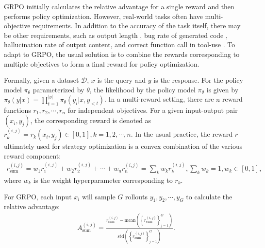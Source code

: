 \documentclass{llmxive}
\begin{document}
GRPO initially calculates the relative advantage for a single reward and then performs policy optimization. However, real-world tasks often have multi-objective requirements. In addition to the accuracy of the task itself, there may be other requirements, such as output length \citep{flashthink, liu2025learn, aggarwal2025l1}, bug rate of generated code \citep{DBLP:journals/ese/TambonDNKDA25, DBLP:conf/icsm/Gao25}, hallucination rate of output content, and correct function call in tool-use \citep{torl, logic_rl}. To adapt to GRPO, the usual solution is to combine the rewards corresponding to multiple objectives to form a final reward for policy optimization.

Formally, given a dataset $\mathcal{D}$, $x$ is the query and $y$ is the response. For the policy model $\pi_\theta$ parameterized by $\theta$, the likelihood by the policy model $\pi_\theta$ is given by $\pi_\theta(y|x) = \prod_{t=1}^{|y|}\pi_\theta(y_i | x, y_{<t})$. In a multi-reward setting, there are $n$ reward functions $r_1, r_2, \cdots, r_n$ for independent objectives. For a given input-output pair $(x_i, y_j)$, the corresponding reward is denoted as $r_k^{(i,j)} = r_k(x_i, y_j) \in [0,1], k=1,2,\cdots,n$. In the usual practice, the reward $r$ ultimately used for strategy optimization is a convex combination of the various reward component:
\begin{align}
    r_\text{sum}^{(i,j)} = w_1r_1^{(i,j)} + w_2r_2^{(i,j)} + \cdots + w_nr_n^{(i,j)} = \sum_{k} w_k r_k^{(i,j)}, \sum_k w_k = 1, w_k \in [0, 1],
\end{align}
where $w_k$ is the weight hyperparameter corresponding to $r_k$.

For GRPO, each input $x_i$ will sample $G$ rollouts $y_1, y_2, \cdots, y_G$ to calculate the relative advantage:
\begin{align}
    A_\text{sum}^{(i,j)} = \frac{r_\text{sum}^{(i,j)} - \text{mean} \left(\left\{ r_\text{sum}^{(i,j)} \right\}_{j=1}^G\right)}{\text{std} \left(\left\{ r_\text{sum}^{(i,j)} \right\}_{j=1}^G\right)}.\label{reward_combination}
\end{align}
\end{document}
